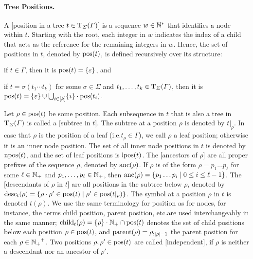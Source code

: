 \documentclass[../document.tex]{subfiles}
\begin{document}
    \paragraph{Tree Positions.}
    A [position in a tree \(t \in \operatorname{T}_\varSigma(\varGamma)\)] is a sequence $w \in \mathbb{N}^*$ that identifies a node within \(t\).
    Starting with the root, each integer in \(w\) indicates the index of a child that acts as the reference for the remaining integers in \(w\).
    Hence, the set of positions in \(t\), denoted by \(\operatorname{pos}(t)\), is defined recursively over its structure:
    \begin{inparaenum}
        \item if \(t \in \varGamma\), then it is \(\operatorname{pos}(t) = \{\varepsilon\}\), and
        \item if \(t = \sigma(t_1 \cdots t_k)\) for some \(\sigma\in \varSigma\) and \(t_1, \ldots, t_k \in \operatorname{T}_\varSigma(\varGamma)\), then it is \(\operatorname{pos}(t) = \{\varepsilon\} \cup \bigcup_{i\in[k]} \{i\}\cdot \operatorname{pos}(t_i)\).
    \end{inparaenum}
    Let \(\rho \in \operatorname{pos}(t)\) be some position.
    Each subsequence in \(t\) that is also a tree in \(\operatorname{T}_\varSigma(\varGamma)\) is called a [subtree in \(t\)].
    The subtree at a position \(\rho\) is denoted by \(t|_\rho\).
    In case that \(\rho\) is the position of a leaf (i.e.\@ \(t_\rho \in \varGamma\)), we call \(\rho\) a leaf position; otherwise it is an inner node position.
    The set of all inner node positions in \(t\) is denoted by \(\operatorname{npos}(t)\), and the set of leaf positions is \(\operatorname{lpos}(t)\).
    The [ancestors of \(\rho\)] are all proper prefixes of the sequence \(\rho\), denoted by \(\operatorname{anc}(\rho)\).
    If \(\rho\) is of the form \(\rho = p_1 \ldots p_\ell\) for some \(\ell \in \mathbb{N}_+\) and \(p_1, \ldots, p_\ell \in \mathbb{N}_+\), then \(\operatorname{anc}(\rho) = \{ p_1 \ldots p_i \mid 0 \leq i \leq \ell-1 \}\).
    The [descendants of \(\rho\) in \(t\)] are all positions in the subtree below \(\rho\), denoted by \(\operatorname{desc}_t(\rho) = \{ \rho \cdot \rho' \in \operatorname{pos}(t) \mid \rho' \in \operatorname{pos}(t|_\rho) \}\).
    The symbol at a position \(\rho\) in \(t\) is denoted  \(t(\rho)\).
    We use the same terminology for position as for nodes, for instance, the terms child position, parent position, etc.\@ are used interchangeably in the same manner; \(\operatorname{child}_t(\rho) = \{\rho\} \cdot \mathbb{N}_+ \cap \operatorname{pos}(t)\) denotes the set of child positions below each position \(\rho \in \operatorname{pos}(t)\), and \(\operatorname{parent}(\rho) = \rho_{:|\rho|-1}\) the parent position for each \(\rho \in {\ensuremath{\mathbb{N}}_+}^+\).
    Two positions \(\rho, \rho' \in \operatorname{pos}(t)\) are called [independent], if \(\rho\) is neither a descendant nor an ancestor of \(\rho'\).
\end{document}
